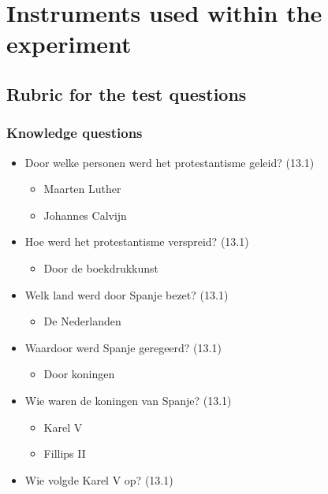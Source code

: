 \chapter{Instruments used within the experiment}
\label{app:instruments}

\section{Rubric for the test questions}
\label{sec:rubic}

\subsection{Knowledge questions}\label{knowledge-questions}

\begin{itemize}
\itemsep1pt\parskip0pt
\item
  Door welke personen werd het protestantisme geleid? (13.1)

  \begin{itemize}
  \itemsep1pt\parskip0pt
  \item
    Maarten Luther
  \item
    Johannes Calvijn
  \end{itemize}
\item
  Hoe werd het protestantisme verspreid? (13.1)

  \begin{itemize}
  \itemsep1pt\parskip0pt
  \item
    Door de boekdrukkunst
  \end{itemize}
\item
  Welk land werd door Spanje bezet? (13.1)

  \begin{itemize}
  \itemsep1pt\parskip0pt
  \item
    De Nederlanden
  \end{itemize}
\item
  Waardoor werd Spanje geregeerd? (13.1)

  \begin{itemize}
  \itemsep1pt\parskip0pt
  \item
    Door koningen
  \end{itemize}
\item
  Wie waren de koningen van Spanje? (13.1)

  \begin{itemize}
  \itemsep1pt\parskip0pt
  \item
    Karel V
  \item
    Fillips II
  \end{itemize}
\item
  Wie volgde Karel V op? (13.1)


\end{itemize}
